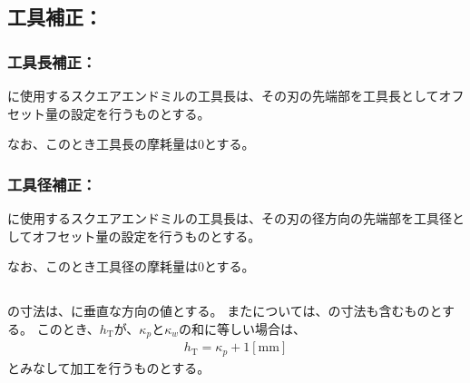\subsection{工具補正：\OutcutMilling}


\subsubsection{工具長補正：\OutcutMilling}
\OutcutMilling に使用するスクエアエンドミルの工具長は、その刃の先端部を工具長としてオフセット量の設定を行うものとする。

なお、このとき工具長の摩耗量は0とする。


\subsubsection{工具径補正：\OutcutMilling}
\OutcutMilling に使用するスクエアエンドミルの工具長は、その刃の径方向の先端部を工具径としてオフセット量の設定を行うものとする。

なお、このとき工具径の摩耗量は0とする。


\subsection{\OutcutLength}
\OutcutLength の寸法は、\EndFace に垂直な方向の値とする。
また\TopOutcutLength については、\KeywayWidth の寸法も含むものとする。
このとき、\TopOutcutLength$h_\mathrm T$が、\KeywayPos$\kappa_p$と\KeywayWidth$\kappa_w$の和に等しい場合は、
\begin{align*}
  h_\mathrm T = \kappa_p+1[\text{mm}]
\end{align*}
とみなして加工を行うものとする。



